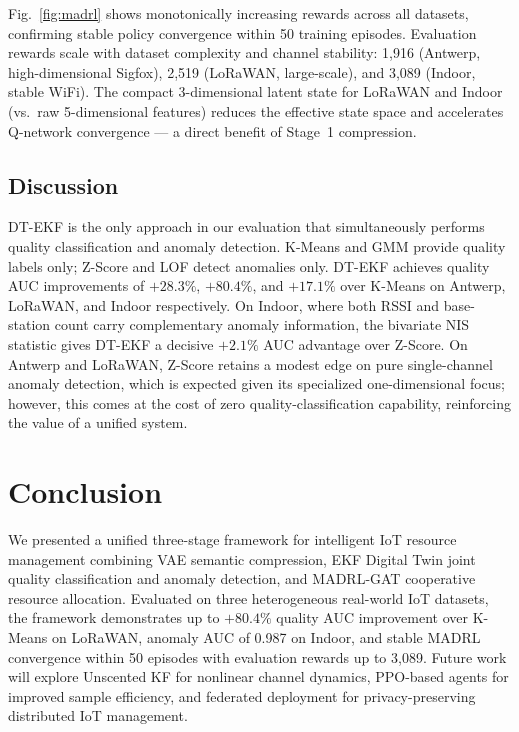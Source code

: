 \documentclass[conference]{IEEEtran}
\begin{document}
Fig.~\ref{fig:madrl} shows monotonically increasing rewards across all
datasets, confirming stable policy convergence within 50 training
episodes. Evaluation rewards scale with dataset complexity and channel
stability: 1,916 (Antwerp, high-dimensional Sigfox),
2,519 (LoRaWAN, large-scale), and 3,089 (Indoor, stable WiFi). The
compact 3-dimensional latent state for LoRaWAN and Indoor (vs.\ raw
5-dimensional features) reduces the effective state space and accelerates
Q-network convergence — a direct benefit of Stage~1 compression.

\subsection{Discussion}

DT-EKF is the only approach in our evaluation that simultaneously
performs quality classification and anomaly detection. K-Means and GMM
provide quality labels only; Z-Score and LOF detect anomalies only.
DT-EKF achieves quality AUC improvements of $+28.3\%$, $+80.4\%$,
and $+17.1\%$ over K-Means on Antwerp, LoRaWAN, and Indoor respectively.
On Indoor, where both RSSI and base-station count carry complementary
anomaly information, the bivariate NIS statistic gives DT-EKF a decisive
$+2.1\%$ AUC advantage over Z-Score. On Antwerp and LoRaWAN, Z-Score
retains a modest edge on pure single-channel anomaly detection, which is
expected given its specialized one-dimensional focus; however, this comes
at the cost of zero quality-classification capability, reinforcing the
value of a unified system.

\section{Conclusion}
\label{sec:conclusion}

We presented a unified three-stage framework for intelligent IoT resource
management combining VAE semantic compression, EKF Digital Twin joint
quality classification and anomaly detection, and MADRL-GAT cooperative
resource allocation. Evaluated on three heterogeneous real-world IoT
datasets, the framework demonstrates up to $+80.4\%$ quality AUC
improvement over K-Means on LoRaWAN, anomaly AUC of 0.987 on Indoor,
and stable MADRL convergence within 50 episodes with evaluation rewards
up to 3,089. Future work will explore Unscented KF for nonlinear
channel dynamics, PPO-based agents for improved sample efficiency, and
federated deployment for privacy-preserving distributed IoT management.
\end{document}
